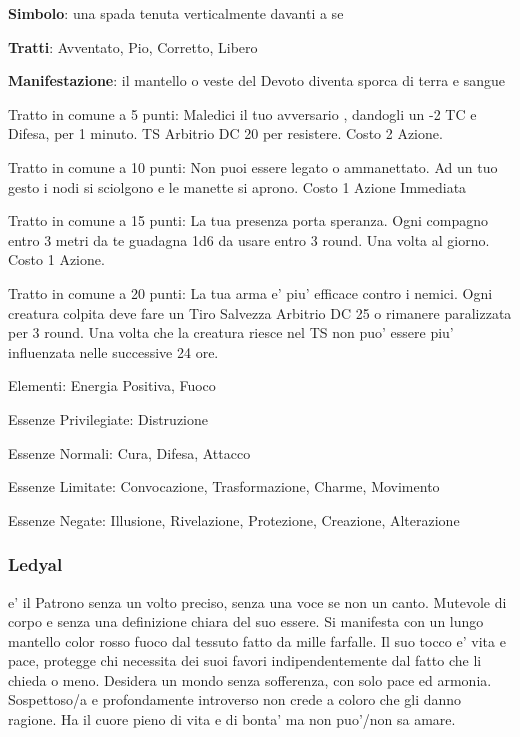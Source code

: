 \documentclass[a4paper,11pt,twoside,openany]{dndbook}
\begin{document}
{\textbf{Simbolo}: una spada tenuta verticalmente davanti a se

\textbf{Tratti}: Avventato, Pio, Corretto, Libero

\textbf{Manifestazione}: il mantello o veste del Devoto diventa sporca
di terra e sangue

\bigskip

Tratto in comune a 5 punti: Maledici il tuo avversario , dandogli un -2 TC e Difesa, per 1 minuto. TS Arbitrio DC 20 per resistere. Costo 2 Azione.

Tratto in comune a 10 punti: Non puoi essere legato o ammanettato. Ad un tuo gesto i nodi si sciolgono e le manette si aprono. Costo 1 Azione Immediata

Tratto in comune a 15 punti: La tua presenza porta speranza. Ogni compagno entro 3 metri da te guadagna 1d6 da usare entro 3 round. Una volta al giorno. Costo 1 Azione.

Tratto in comune a 20 punti: La tua arma e' piu' efficace contro i nemici. Ogni creatura colpita deve fare un Tiro Salvezza Arbitrio DC 25 o rimanere paralizzata per 3 round. Una volta che la creatura riesce nel TS non puo' essere piu' influenzata nelle successive 24 ore.

\bigskip

Elementi: Energia Positiva, Fuoco

\bigskip

Essenze Privilegiate: Distruzione

Essenze Normali: Cura, Difesa, Attacco

Essenze Limitate: Convocazione, Trasformazione, Charme, Movimento

Essenze Negate: Illusione, Rivelazione, Protezione, Creazione, Alterazione

\subsubsection{Ledyal}

\label{ledyal}

e' il Patrono senza un volto preciso, senza una voce se non un canto. Mutevole di corpo e senza una definizione chiara del suo essere. Si manifesta con un lungo mantello color rosso fuoco dal tessuto fatto da mille farfalle. Il suo tocco e' vita e pace, protegge chi necessita dei suoi favori indipendentemente dal fatto che li chieda o meno. Desidera un mondo senza sofferenza, con solo pace ed armonia. Sospettoso/a e profondamente introverso non crede a coloro che gli danno ragione. Ha il cuore pieno di vita e di bonta' ma non puo'/non sa amare.

}
\end{document}
